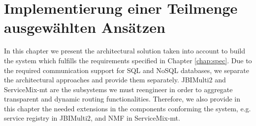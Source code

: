\chapter{Implementierung einer Teilmenge ausgewählten Ansätzen}
\label{chap:Implementierung}


In this chapter we present the architectural solution taken into account to build the system which fulfills the requirements specified in Chapter \ref{chap:spec}. Due to the required communication support for \ac{SQL} and \ac{NoSQL} databases, we separate the architectural approaches and provide them separately. JBIMulti2 and ServiceMix-mt are the subsystems we must reengineer in order to aggregate transparent and dynamic routing functionalities. Therefore, we also provide in this chapter the needed extensions in the components conforming the system, e.g. service registry in JBIMulti2, and \ac{NMF} in ServiceMix-mt.



\FloatBarrier